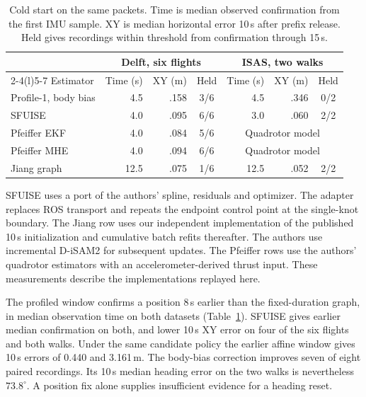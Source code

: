\documentclass{IEEEtaes}
\begin{document}
\begin{table}[t]
\caption{Cold start on the same packets. Time is median observed confirmation from the first IMU sample. XY is median horizontal error 10\,s after prefix release. Held gives recordings within threshold from confirmation through 15\,s.}
\label{tab:cold}\centering\tablefont
\setlength{\tabcolsep}{2.25pt}
\begin{tabular}{@{}lrrcrrc@{}}
\toprule
&\multicolumn{3}{c}{Delft, six flights}&\multicolumn{3}{c}{ISAS, two walks}\\
\cmidrule(lr){2-4}\cmidrule(l){5-7}
Estimator&Time (s)&XY (m)&Held&Time (s)&XY (m)&Held\\\midrule
Profile-1, body bias&4.5&.158&3/6&4.5&.346&0/2\\
SFUISE~\cite{sfuise}&4.0&.095&6/6&3.0&.060&2/2\\
Pfeiffer EKF~\cite{pfeiffer}&4.0&.084&5/6&\multicolumn{3}{c}{Quadrotor model}\\
Pfeiffer MHE~\cite{pfeiffer}&4.0&.094&6/6&\multicolumn{3}{c}{Quadrotor model}\\
Jiang graph~\cite{jiang}&12.5&.075&1/6&12.5&.052&2/2\\
\bottomrule
\end{tabular}
\end{table}

SFUISE uses a port of the authors' spline, residuals and optimizer. The adapter replaces ROS transport and repeats the endpoint control point at the single-knot boundary. The Jiang row uses our independent implementation of the published 10\,s initialization and cumulative batch refits thereafter. The authors use incremental D-iSAM2 for subsequent updates. The Pfeiffer rows use the authors' quadrotor estimators with an accelerometer-derived thrust input. These measurements describe the implementations replayed here.

The profiled window confirms a position 8\,s earlier than the fixed-duration graph, in median observation time on both datasets (Table~\ref{tab:cold}). SFUISE gives earlier median confirmation on both, and lower 10\,s XY error on four of the six flights and both walks. Under the same candidate policy the earlier affine window gives 10\,s errors of 0.440 and 3.161\,m. The body-bias correction improves seven of eight paired recordings. Its 10\,s median heading error on the two walks is nevertheless $73.8^\circ$. A position fix alone supplies insufficient evidence for a heading reset.
\end{document}
